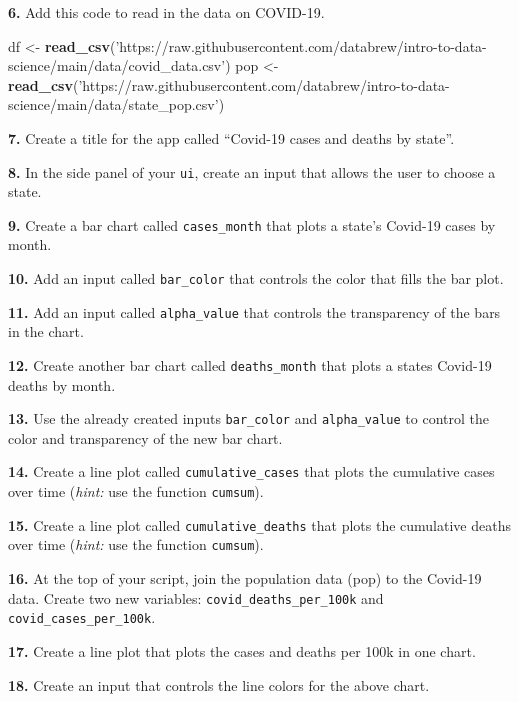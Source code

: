 \documentclass[]{book}
\newenvironment{Shaded}{\begin{snugshade}}{\end{snugshade}}
\newcommand{\KeywordTok}[1]{\textcolor[rgb]{0.13,0.29,0.53}{\textbf{#1}}}
\newcommand{\NormalTok}[1]{#1}
\newcommand{\StringTok}[1]{\textcolor[rgb]{0.31,0.60,0.02}{#1}}
\begin{document}
\textbf{6.} Add this code to read in the data on COVID-19.

\begin{Shaded}
\begin{Highlighting}[]
\NormalTok{df <-}\StringTok{ }\KeywordTok{read_csv}\NormalTok{(}\StringTok{'https://raw.githubusercontent.com/databrew/intro-to-data-science/main/data/covid_data.csv'}\NormalTok{)}
\NormalTok{pop <-}\StringTok{ }\KeywordTok{read_csv}\NormalTok{(}\StringTok{'https://raw.githubusercontent.com/databrew/intro-to-data-science/main/data/state_pop.csv'}\NormalTok{)}
\end{Highlighting}
\end{Shaded}

\textbf{7.} Create a title for the app called ``Covid-19 cases and deaths by state''.

\textbf{8.} In the side panel of your \texttt{ui}, create an input that allows the user to choose a state.

\textbf{9.} Create a bar chart called \texttt{cases\_month} that plots a state's Covid-19 cases by month.

\textbf{10.} Add an input called \texttt{bar\_color} that controls the color that fills the bar plot.

\textbf{11.} Add an input called \texttt{alpha\_value} that controls the transparency of the bars in the chart.

\textbf{12.} Create another bar chart called \texttt{deaths\_month} that plots a states Covid-19 deaths by month.

\textbf{13.} Use the already created inputs \texttt{bar\_color} and \texttt{alpha\_value} to control the color and transparency of the new bar chart.

\textbf{14.} Create a line plot called \texttt{cumulative\_cases} that plots the cumulative cases over time (\emph{hint:} use the function \texttt{cumsum}).

\textbf{15.} Create a line plot called \texttt{cumulative\_deaths} that plots the cumulative deaths over time (\emph{hint:} use the function \texttt{cumsum}).

\textbf{16.} At the top of your script, join the population data (pop) to the Covid-19 data. Create two new variables: \texttt{covid\_deaths\_per\_100k} and \texttt{covid\_cases\_per\_100k}.

\textbf{17.} Create a line plot that plots the cases and deaths per 100k in one chart.

\textbf{18.} Create an input that controls the line colors for the above chart.
\end{document}
